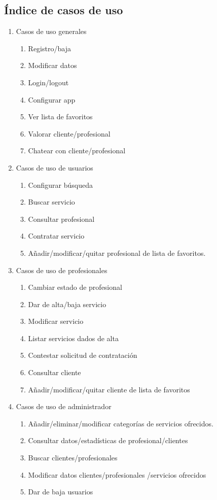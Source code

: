 \subsection{Índice de casos de uso}
\renewcommand{\labelenumii}{\theenumi.\arabic{enumii}.}
\begin{enumerate}
    \item Casos de uso generales
    \begin{enumerate}
        \item Registro/baja
        \item Modificar datos
        \item Login/logout
        \item Configurar app
        \item Ver lista de favoritos
        \item Valorar cliente/profesional
        \item Chatear con cliente/profesional
    \end{enumerate}
    \item Casos de uso de usuarios
    \begin{enumerate}
        \item Configurar búsqueda
        \item Buscar servicio
        \item Consultar profesional
        \item Contratar servicio
        \item Añadir/modificar/quitar profesional de lista de favoritos.
    \end{enumerate}
    \item Casos de uso de profesionales
    \begin{enumerate}
        \item Cambiar estado de profesional
        \item Dar de alta/baja servicio
        \item Modificar servicio
        \item Listar servicios dados de alta
        \item Contestar solicitud de contratación
        \item Consultar cliente
        \item Añadir/modificar/quitar cliente de lista de favoritos
    \end{enumerate}
    \item Casos de uso de administrador
    \begin{enumerate}
        \item Añadir/eliminar/modificar categorías de servicios ofrecidos.
        \item Consultar datos/estadísticas de profesional/clientes
        \item Buscar clientes/profesionales
        \item Modificar datos clientes/profesionales /servicios ofrecidos
        \item Dar de baja usuarios
    \end{enumerate}
\end{enumerate}
\newpage
